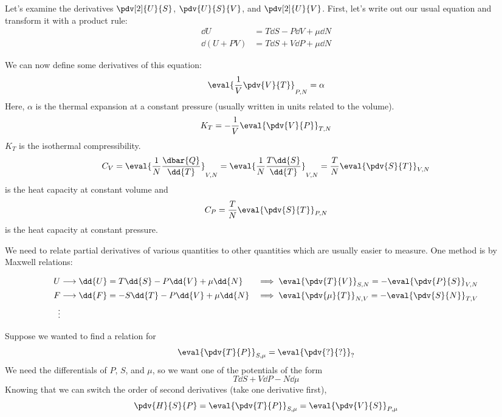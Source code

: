 \documentclass[a4paper,twoside,master.tex]{subfiles}
\begin{document}

Let's examine the derivatives $ \pdv[2]{U}{S} $, $ \pdv{U}{S}{V} $, and $ \pdv[2]{U}{V} $. First, let's write out our usual equation and transform it with a product rule:
\begin{align}
    \dd{U} &= T \dd{S} - P \dd{V} + \mu \dd{N} \\
    \dd{(U + PV)} &= T \dd{S} + V \dd{P} + \mu \dd{N}
\end{align}

We can now define some derivatives of this equation:
\begin{equation}
    \eval{\frac{1}{V} \pdv{V}{T}}_{P,N} = \alpha
\end{equation}
Here, $ \alpha $ is the thermal expansion at a constant pressure (usually written in units related to the volume).
\begin{equation}
    K_T = - \frac{1}{V} \eval{\pdv{V}{P}}_{T,N}
\end{equation}
$ K_T $ is the isothermal compressibility.
\begin{equation}
    C_V = \eval{\frac{1}{N} \frac{\dbar{Q}}{\dd{T}}}_{V,N} = \eval{\frac{1}{N} \frac{T \dd{S}}{\dd{T}}}_{V,N} = \frac{T}{N} \eval{\pdv{S}{T}}_{V,N}
\end{equation}
is the heat capacity at constant volume and
\begin{equation}
    C_P = \frac{T}{N} \eval{\pdv{S}{T}}_{P,N}
\end{equation}
is the heat capacity at constant pressure.

We need to relate partial derivatives of various quantities to other quantities which are usually easier to measure. One method is by Maxwell relations:

\begin{alignat}{2}
    U &\longrightarrow \dd{U} = T \dd{S} - P \dd{V} + \mu \dd{N} &\implies \eval{\pdv{T}{V}}_{S,N} = - \eval{\pdv{P}{S}}_{V,N} \\
    F &\longrightarrow \dd{F} = -S \dd{T} - P \dd{V} + \mu \dd{N} &\implies \eval{\pdv{\mu}{T}}_{N,V} = - \eval{\pdv{S}{N}}_{T,V} \\
    \vdots
\end{alignat}

Suppose we wanted to find a relation for
\begin{equation}
    \eval{\pdv{T}{P}}_{S, \mu} = \eval{\pdv{?}{?}}_{?} 
\end{equation}
We need the differentials of $ P $, $ S $, and $ \mu $, so we want one of the potentials of the form
\begin{equation}
    T \dd{S} + V \dd{P} - N \dd{\mu}
\end{equation}
Knowing that we can switch the order of second derivatives (take one derivative first),
\begin{equation}
    \pdv{H}{S}{P} = \eval{\pdv{T}{P}}_{S, \mu} = \eval{\pdv{V}{S}}_{P, \mu}
\end{equation}
\end{document}
